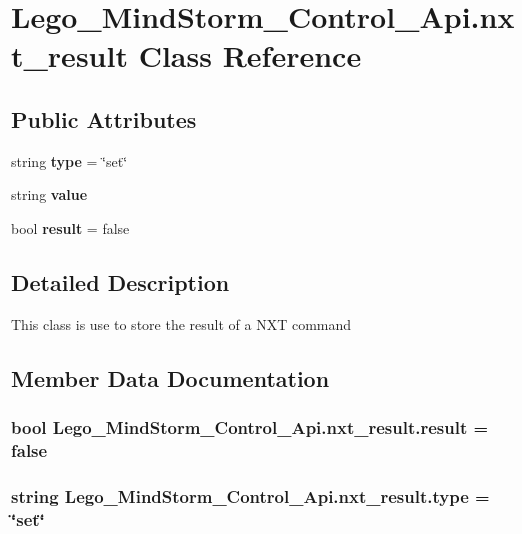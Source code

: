 \section{Lego\_\-MindStorm\_\-Control\_\-Api.nxt\_\-result Class Reference}
\label{class_lego___mind_storm___control___api_1_1nxt__result}
\subsection*{Public Attributes}
\begin{CompactItemize}
\item 
string {\bf type} = \char`\"{}set\char`\"{}
\item 
string {\bf value}
\item 
bool {\bf result} = false
\end{CompactItemize}


\subsection{Detailed Description}
This class is use to store the result of a NXT command 

\subsection{Member Data Documentation}
\subsubsection[{result}]{\setlength{\rightskip}{0pt plus 5cm}bool {\bf Lego\_\-MindStorm\_\-Control\_\-Api.nxt\_\-result.result} = false}\label{class_lego___mind_storm___control___api_1_1nxt__result_1500078368b9a095318ef49eec8020bb}


\subsubsection[{type}]{\setlength{\rightskip}{0pt plus 5cm}string {\bf Lego\_\-MindStorm\_\-Control\_\-Api.nxt\_\-result.type} = \char`\"{}set\char`\"{}}\label{class_lego___mind_storm___control___api_1_1nxt__result_461016351870c0b5d5ddae997e800946}


